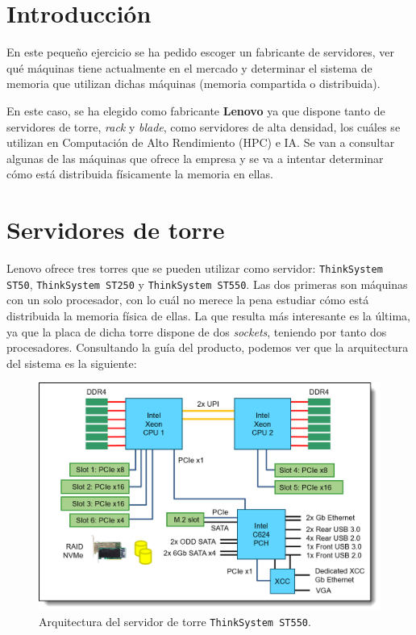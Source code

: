 \documentclass[11pt,a4paper]{article}
\begin{document}
\newpage
\thispagestyle{empty}				%
\mbox{}
\newpage


\setlength{\parskip}{1em}

\section{Introducción}

En este pequeño ejercicio se ha pedido escoger un fabricante de servidores, ver
qué máquinas tiene actualmente en el mercado y determinar el sistema de memoria
que utilizan dichas máquinas (memoria compartida o distribuida).

En este caso, se ha elegido como fabricante \textbf{Lenovo} ya que dispone tanto
de servidores de torre, \textit{rack} y \textit{blade}, como servidores de alta
densidad, los cuáles se utilizan en Computación de Alto Rendimiento (HPC) e IA.
Se van a consultar algunas de las máquinas que ofrece la empresa y se va a intentar
determinar cómo está distribuida físicamente la memoria en ellas.

\section{Servidores de torre}

Lenovo ofrece tres torres que se pueden utilizar como servidor: \texttt{ThinkSystem ST50},
\texttt{ThinkSystem ST250} y \texttt{ThinkSystem ST550}. Las dos primeras son máquinas con un
solo procesador, con lo cuál no merece la pena estudiar cómo está distribuida la memoria física
de ellas. La que resulta más interesante es la última, ya que la placa de dicha torre dispone
de dos \textit{sockets}, teniendo por tanto dos procesadores. Consultando la guía del producto,
podemos ver que la arquitectura del sistema es la siguiente:

\begin{figure}[H]
	\centering
	\includegraphics[scale=0.3]{img/torre-diagrama}
	\caption{Arquitectura del servidor de torre \texttt{ThinkSystem ST550}.}
	\label{fig:torre}
\end{figure}
\end{document}
